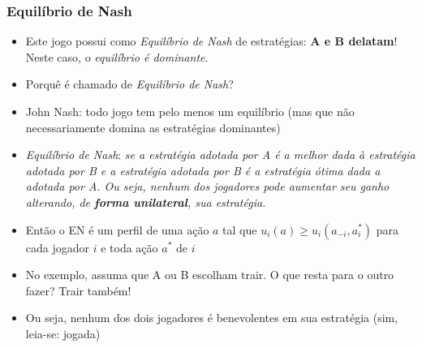 
 
\begin{frame}
    \frametitle{Equilíbrio de Nash}

 \begin{itemize}
   
\item Este jogo possui como \textit{Equilíbrio de Nash} de estratégias: 
\textbf{A e B delatam}! Neste caso, o \textit{equilíbrio é dominante}.

\item Porquê é chamado de \textit{Equilíbrio de Nash}?
\pause
 
 \item John Nash: todo jogo tem pelo menos um equilíbrio (mas que não necessariamente domina as estratégias dominantes)
 
\item \textit{Equilíbrio de Nash}: \textit{se a estratégia adotada por A é a melhor dada à estratégia adotada por B e a estratégia adotada por B é a estratégia ótima dada a adotada por A. Ou seja, nenhum dos jogadores pode aumentar seu ganho alterando, de \textbf{forma unilateral}, sua estratégia.}

    
  \item   Então o EN é um perfil de uma  ação $a$ tal que $u_i(a) \ge u_i(a_{-i}, a^*_i)$ para cada jogador $i$ e toda ação $a^*$ de $i$
\pause
 
\item No exemplo, assuma que A ou B escolham trair. O que resta para o outro fazer? Trair também! 

\item Ou seja, nenhum dos dois jogadores é benevolentes em sua estratégia (sim, leia-se: jogada)
 

 \end{itemize}

\end{frame}



